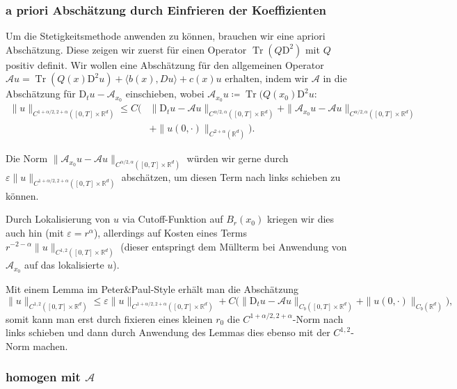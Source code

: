 \documentclass[11pt,a4paper]{scrartcl}
\newcommand{\R}{\mathbb{R}} %
\newcommand{\A}{\mathcal{A}}
\theoremstyle{plain}
\theoremstyle{definition}
\theoremstyle{remark}
\DeclareMathOperator{\Tr}{Tr}
\begin{document}
\subsubsection{a priori Abschätzung durch Einfrieren der Koeffizienten}

Um die Stetigkeitsmethode anwenden zu können, brauchen wir eine apriori Abschätzung. Diese zeigen wir zuerst für einen Operator $\Tr(Q\mathrm{D}^2)$ mit $Q$ positiv definit. Wir wollen eine Abschätzung für den allgemeinen Operator $\A u = \Tr(Q(x)\mathrm{D}^2 u) + \langle b(x), Du\rangle + c(x)u$ erhalten, indem wir $\A$ in die Abschätzung für $\mathrm{D}_t u-\A_{x_0}$ einschieben, wobei $\A_{x_0} u\coloneqq \Tr(Q(x_0)\mathrm{D}^2 u$: 
%
\begin{align*}
\|u\|_{C^{1+\alpha/2,2+\alpha}([0,T]\times \R^d)} 
\leq C\big( & \|\mathrm{D}_t u-\A u\|_{C^{\alpha/2,\alpha}([0,T]\times \R^d)} 
+ \|\A_{x_0} u-\A u\|_{C^{\alpha/2,\alpha}([0,T]\times \R^d)} \\
 & 
+ \|u(0,\cdot)\|_{C^{2+\alpha}(\R^d)}
\big).\end{align*}

Die Norm $\|\A_{x_0} u-\A u\|_{C^{\alpha/2,\alpha}([0,T]\times \R^d)}$ würden wir gerne durch $\varepsilon \|u\|_{C^{1+\alpha/2,2+\alpha}([0,T]\times \R^d)}$ abschätzen, um diesen Term nach links schieben zu können.

Durch Lokalisierung von $u$ via Cutoff-Funktion auf $B_r(x_0)$ kriegen wir dies auch hin (mit $\varepsilon=r^\alpha$), allerdings auf Kosten eines Terms $r^{-2-\alpha}\|u\|_{C^{1,2}([0,T]\times \R^d)}$ (dieser entspringt dem Müllterm bei Anwendung von $\A_{x_0}$ auf das lokalisierte $u$).

Mit einem Lemma im Peter\&Paul-Style erhält man die Abschätzung $$\|u\|_{C^{1,2}([0,T]\times \R^d)} \leq \varepsilon \|u\|_{C^{1+\alpha/2,2+\alpha}([0,T]\times \R^d)} + C \big( \|\mathrm{D}_t u-\A u\|_{C_b([0,T]\times \R^d)} + \|u(0,\cdot)\|_{C_b(\R^d)} \big),$$ somit kann man erst durch fixieren eines kleinen $r_0$ die $C^{1+\alpha/2,2+\alpha}$-Norm nach links schieben und dann durch Anwendung des Lemmas dies ebenso mit der $C^{1,2}$-Norm machen.

\subsubsection{homogen mit $\A$}
\end{document}
